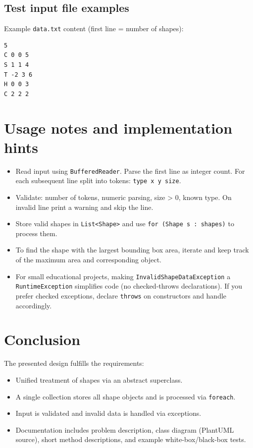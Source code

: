 \documentclass[a4paper,12pt]{article}
\begin{document}
\subsection{Test input file examples}
Example \texttt{data.txt} content (first line = number of shapes):
\begin{verbatim}
5
C 0 0 5
S 1 1 4
T -2 3 6
H 0 0 3
C 2 2 2
\end{verbatim}

\section{Usage notes and implementation hints}
\begin{itemize}
  \item Read input using \texttt{BufferedReader}. Parse the first line as integer count. For each subsequent line split into tokens: \texttt{type x y size}.
  \item Validate: number of tokens, numeric parsing, size > 0, known type. On invalid line print a warning and skip the line.
  \item Store valid shapes in \texttt{List<Shape>} and use \texttt{for (Shape s : shapes)} to process them.
  \item To find the shape with the largest bounding box area, iterate and keep track of the maximum area and corresponding object.
  \item For small educational projects, making \texttt{InvalidShapeDataException} a \texttt{RuntimeException} simplifies code (no checked-throws declarations). If you prefer checked exceptions, declare \texttt{throws} on constructors and handle accordingly.
\end{itemize}

\section{Conclusion}
The presented design fulfills the requirements:
\begin{itemize}
  \item Unified treatment of shapes via an abstract superclass.
  \item A single collection stores all shape objects and is processed via \texttt{foreach}.
  \item Input is validated and invalid data is handled via exceptions.
  \item Documentation includes problem description, class diagram (PlantUML source), short method descriptions, and example white-box/black-box tests.
\end{itemize}
\end{document}
